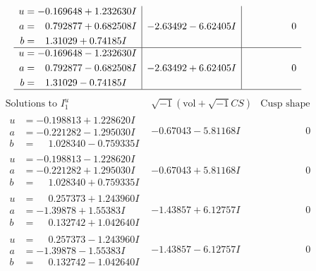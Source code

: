 \documentclass[1p]{elsarticle_modified}
\theoremstyle{definition}
\newcommand{\I}{\sqrt{-1}}
\begin{document}
$$\begin{array}{c|c|c}
\begin{aligned}
u &= -0.169648 + 1.232630 I \\
a &= \phantom{-}0.792877 + 0.682508 I \\
b &= \phantom{-}1.31029 + 0.74185 I\end{aligned}
 & -2.63492 - 6.62405 I & \phantom{-0.000000 } 0 \\ \hline\begin{aligned}
u &= -0.169648 - 1.232630 I \\
a &= \phantom{-}0.792877 - 0.682508 I \\
b &= \phantom{-}1.31029 - 0.74185 I\end{aligned}
 & -2.63492 + 6.62405 I & \phantom{-0.000000 } 0\\
 \hline 
 \end{array}$$\newpage$$\begin{array}{c|c|c}  
\text{Solutions to }I^u_{1}& \I (\text{vol} + \sqrt{-1}CS) & \text{Cusp shape}\\
 \hline 
\begin{aligned}
u &= -0.198813 + 1.228620 I \\
a &= -0.221282 - 1.295030 I \\
b &= \phantom{-}1.028340 - 0.759335 I\end{aligned}
 & -0.67043 - 5.81168 I & \phantom{-0.000000 } 0 \\ \hline\begin{aligned}
u &= -0.198813 - 1.228620 I \\
a &= -0.221282 + 1.295030 I \\
b &= \phantom{-}1.028340 + 0.759335 I\end{aligned}
 & -0.67043 + 5.81168 I & \phantom{-0.000000 } 0 \\ \hline\begin{aligned}
u &= \phantom{-}0.257373 + 1.243960 I \\
a &= -1.39878 + 1.55383 I \\
b &= \phantom{-}0.132742 + 1.042640 I\end{aligned}
 & -1.43857 + 6.12757 I & \phantom{-0.000000 } 0 \\ \hline\begin{aligned}
u &= \phantom{-}0.257373 - 1.243960 I \\
a &= -1.39878 - 1.55383 I \\
b &= \phantom{-}0.132742 - 1.042640 I\end{aligned}
 & -1.43857 - 6.12757 I & \phantom{-0.000000 } 0 \\ \hline\begin{aligned}

\end{aligned}
\end{array}$$
\end{document}
